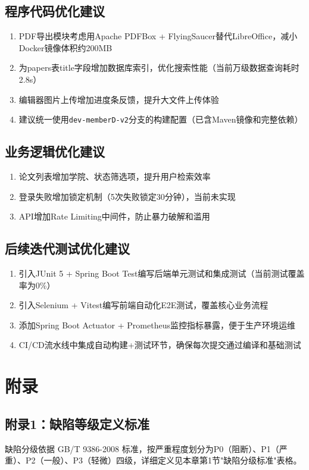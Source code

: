 \subsection{程序代码优化建议}
\begin{enumerate}
    \item PDF导出模块考虑用Apache PDFBox + FlyingSaucer替代LibreOffice，减小Docker镜像体积约200MB
    \item 为papers表title字段增加数据库索引，优化搜索性能（当前万级数据查询耗时2.8s）
    \item 编辑器图片上传增加进度条反馈，提升大文件上传体验
    \item 建议统一使用\texttt{dev-memberD-v2}分支的构建配置（已含Maven镜像和完整依赖）
\end{enumerate}

\subsection{业务逻辑优化建议}
\begin{enumerate}
    \item 论文列表增加学院、状态筛选项，提升用户检索效率
    \item 登录失败增加锁定机制（5次失败锁定30分钟），当前未实现
    \item API增加Rate Limiting中间件，防止暴力破解和滥用
\end{enumerate}

\subsection{后续迭代测试优化建议}
\begin{enumerate}
    \item 引入JUnit 5 + Spring Boot Test编写后端单元测试和集成测试（当前测试覆盖率为0\%）
    \item 引入Selenium + Vitest编写前端自动化E2E测试，覆盖核心业务流程
    \item 添加Spring Boot Actuator + Prometheus监控指标暴露，便于生产环境运维
    \item CI/CD流水线中集成自动构建+测试环节，确保每次提交通过编译和基础测试
\end{enumerate}

\section{附录}

\subsection{附录1：缺陷等级定义标准}
缺陷分级依据 GB/T 9386-2008 标准，按严重程度划分为P0（阻断）、P1（严重）、P2（一般）、P3（轻微）四级，详细定义见本章第1节"缺陷分级标准"表格。

